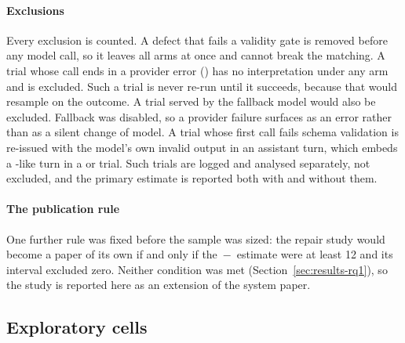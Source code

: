 \paragraph{Exclusions}
Every exclusion is counted. A defect that fails a validity gate is removed
before any model call, so it leaves all arms at once and cannot break the
matching. A trial whose call ends in a provider error () has
no interpretation under any arm and is excluded. Such a trial is never re-run
until it succeeds, because that would resample on the outcome. A trial served
by the fallback model would also be excluded. Fallback was disabled, so a
provider failure surfaces as an error rather than as a silent change of model.
A trial whose first call fails schema validation is re-issued with the
model's own invalid output in an assistant turn, which embeds a
-like turn in a  or  trial. Such trials are logged and
analysed separately, not excluded, and the primary estimate is reported both
with and without them.

\paragraph{The publication rule}
One further rule was fixed before the sample was sized: the repair study would
become a paper of its own if and only if the \,$-$\, estimate
were at least 12\pp{} and its interval excluded zero. Neither condition was
met (Section~\ref{sec:results-rq1}), so the study is reported here as an
extension of the system paper.

\subsection{Exploratory cells}
\label{sec:design-cells}

